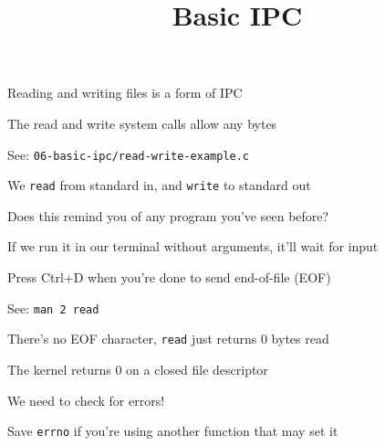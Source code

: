 

\title{Basic IPC}



  \begin{frame}
    \titlepage
  \end{frame}

  \begin{slide}


    Reading and writing files is a form of IPC
    \medskip

    The read and write system calls allow any bytes

  \end{slide}

  \begin{slide}


    See: \texttt{06-basic-ipc/read-write-example.c}
    \medskip

    We \texttt{read} from standard in, and \texttt{write} to standard out

    \leftspace{}Does this remind you of any program you've seen before?
    \medskip

    If we run it in our terminal without arguments, it'll wait for input

    \leftspace{}Press Ctrl+D when you're done to send end-of-file (EOF)
  \end{slide}

  \begin{slide}

    See: \texttt{man 2 read}
    \medskip

    There's no EOF character, \texttt{read} just returns 0 bytes read

    \leftspace{}The kernel returns 0 on a closed file descriptor
    \medskip

    We need to check for errors!

    \leftspace{}Save \texttt{errno} if you're using another function that may
                  set it

  \end{slide}

